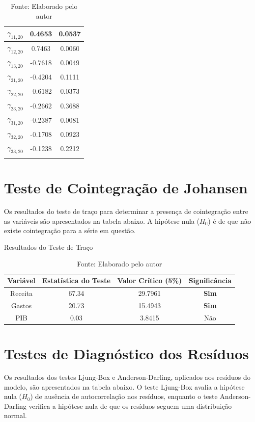 \documentclass[a4paper, 12pt, openany, oneside, brazil]{abntex2}
\begin{document}
\begin{apendicesenv}
\begin{longtable}{|c|c|c|}
	\hline
	$\gamma_{11,20}$ & 0.4653 & 0.0537 \\
	\hline
	$\gamma_{12,20}$ & 0.7463 & 0.0060 \\
	\hline
	$\gamma_{13,20}$ & -0.7618 & 0.0049 \\
	\hline
	$\gamma_{21,20}$ & -0.4204 & 0.1111 \\
	\hline
	$\gamma_{22,20}$ & -0.6182 & 0.0373 \\
	\hline
	$\gamma_{23,20}$ & -0.2662 & 0.3688 \\
	\hline
	$\gamma_{31,20}$ & -0.2387 & 0.0081 \\
	\hline
	$\gamma_{32,20}$ & -0.1708 & 0.0923 \\
	\hline
	$\gamma_{33,20}$ & -0.1238 & 0.2212 \\
	\hline
	\caption*{Fonte: Elaborado pelo autor}
\end{longtable}


\section{Teste de Cointegração de Johansen}

Os resultados do teste de traço para determinar a presença de cointegração entre as variáveis são apresentados na tabela abaixo. A hipótese nula (\(H_0\)) é de que não existe cointegração para a série em questão.

\begin{table}[h!]
	\centering
	\caption{Resultados do Teste de Traço}
	\begin{tabular}{|c|c|c|c|}
		\hline
		\textbf{Variável} & \textbf{Estatística do Teste} & \textbf{Valor Crítico (5\%)} & \textbf{Significância} \\ \hline
		Receita       & 67.34 & 29.7961 & \textbf{Sim} \\ \hline
		Gastos    & 20.73 & 15.4943 & \textbf{Sim} \\ \hline
		PIB              &  0.03 &  3.8415 & Não \\ \hline
	\end{tabular}
	\caption*{Fonte: Elaborado pelo autor}
\end{table}

\section{Testes de Diagnóstico dos Resíduos}

Os resultados dos testes Ljung-Box e Anderson-Darling, aplicados aos resíduos do modelo, são apresentados na tabela abaixo. O teste Ljung-Box avalia a hipótese nula (\(H_0\)) de ausência de autocorrelação nos resíduos, enquanto o teste Anderson-Darling verifica a hipótese nula de que os resíduos seguem uma distribuição normal.


\end{apendicesenv}
\end{document}
